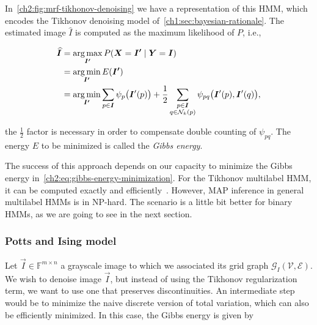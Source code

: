In~\cref{ch2:fig:mrf-tikhonov-denoising} we have a representation of this HMM, which encodes the Tikhonov denoising model of~\cref{ch1:sec:bayesian-rationale}. The estimated image $\widehat{I}$ is computed as the maximum likelihood of $P$, i.e.,

\begin{align}
	\widehat{\bm{I}} &= \operatorname*{arg\,max}_{\bm{I'}}{P(\bm{X}=\bm{I'} \; | \; \bm{Y} = \bm{I} }) \nonumber \\
	&= \operatorname*{arg\,min}_{\bm{I'}}{E(\bm{I'})} \nonumber \\
	&= \operatorname*{arg\,min}_{\bm{I'}}{\sum_{p \in \bm{I}}{\psi_p\big({\bm{I}'(p)}\big)}} + \frac{1}{2}\sum_{ \substack{ p \in \bm{I} \\ q \in \mathcal{N}_k(p)}}{\psi_{pq}\big( {\bm{I}'(p),\bm{I}'(q) \big)}},
	\label{ch2:eq:gibbs-energy-minimization}
\end{align}

the $\frac{1}{2}$ factor is necessary in order to compensate double counting of $\psi_{pq}$. The energy $E$ to be minimized is called the \emph{Gibbs energy}.



The success of this approach depends on our capacity to minimize the Gibbs energy in~\cref{ch2:eq:gibbs-energy-minimization}. For the Tikhonov multilabel HMM, it can be computed exactly and efficiently~\cite{ishikawa03}. However, MAP inference in general multilabel HMMs is in NP-hard. The scenario is a little bit better for binary HMMs, as we are going to see in the next section.

\subsubsection{Potts and Ising model}

Let $\vec{I} \in \mathbb{F}^{m \times n}$ a grayscale image to which we associated its grid graph $\mathcal{G}_I(\mathcal{V},\mathcal{E})$. We wish to denoise image $\vec{I}$, but instead of using the Tikhonov regularization term, we want to use one that preserves discontinuities. An intermediate step would be to minimize the naive discrete version of total variation, which can also be efficiently minimized. In this case, the Gibbs energy is given by

